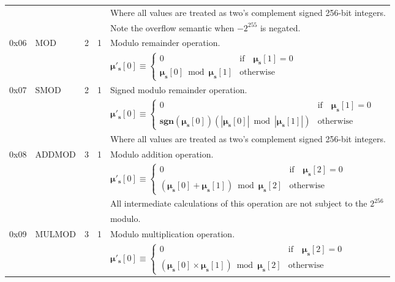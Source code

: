 \documentclass[9pt,oneside]{amsart}
\begin{document}
\begin{tabu}{r l r r l}
&&&& Where all values are treated as two's complement signed 256-bit integers. \\
&&&& Note the overflow semantic when $-2^{255}$ is negated.\\
\midrule
0x06 & {\small MOD} & 2 & 1 & Modulo remainder operation. \\
&&&& $\boldsymbol{\mu}'_{\mathbf{s}}[0] \equiv \begin{cases}0 & \text{if} \quad \boldsymbol{\mu}_{\mathbf{s}}[1] = 0\\ \boldsymbol{\mu}_{\mathbf{s}}[0] \bmod \boldsymbol{\mu}_{\mathbf{s}}[1] & \text{otherwise}\end{cases}$  \\
\midrule
0x07 & {\small SMOD} & 2 & 1 & Signed modulo remainder operation. \\
&&&& $\boldsymbol{\mu}'_{\mathbf{s}}[0] \equiv \begin{cases}0 & \text{if} \quad \boldsymbol{\mu}_{\mathbf{s}}[1] = 0\\ \mathbf{sgn} (\boldsymbol{\mu}_{\mathbf{s}}[0]) (|\boldsymbol{\mu}_{\mathbf{s}}[0]| \bmod |\boldsymbol{\mu}_{\mathbf{s}}[1]|) & \text{otherwise}\end{cases}$  \\
&&&& Where all values are treated as two's complement signed 256-bit integers. \\
\midrule
0x08 & {\small ADDMOD} & 3 & 1 & Modulo addition operation. \\
&&&& $\boldsymbol{\mu}'_{\mathbf{s}}[0] \equiv \begin{cases}0 & \text{if} \quad \boldsymbol{\mu}_{\mathbf{s}}[2] = 0\\ (\boldsymbol{\mu}_{\mathbf{s}}[0] + \boldsymbol{\mu}_{\mathbf{s}}[1]) \bmod \boldsymbol{\mu}_{\mathbf{s}}[2] & \text{otherwise}\end{cases}$  \\
&&&& All intermediate calculations of this operation are not subject to the $2^{256}$ \\
&&&& modulo. \\
\midrule
0x09 & {\small MULMOD} & 3 & 1 & Modulo multiplication operation. \\
&&&& $\boldsymbol{\mu}'_{\mathbf{s}}[0] \equiv \begin{cases}0 & \text{if} \quad \boldsymbol{\mu}_{\mathbf{s}}[2] = 0\\ (\boldsymbol{\mu}_{\mathbf{s}}[0] \times \boldsymbol{\mu}_{\mathbf{s}}[1]) \bmod \boldsymbol{\mu}_{\mathbf{s}}[2] & \text{otherwise}\end{cases}$  \\

\end{tabu}
\end{document}
